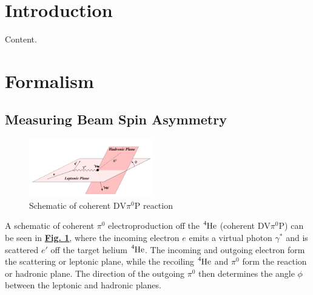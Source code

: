 \documentclass[10pt,prd,aps,showpacs,twocolumn,unsortedaddress]{revtex4-1}
\newcommand\he{{\ce{^{4}He}}}
\newcommand\pio{{\pi^0}}
\newcommand\dvmp{{\text{DV}\pio\text{P}}}
\renewcommand\b[1]{{\textbf{#1}}}
\renewcommand\u[1]{{\underline{#1}}}
\newcommand\Fig[1]{\b{{\u{{Fig. #1}}}}}
\begin{document}

\section{Introduction \label{intro}}
\label{sect1}
Content.
\section{Formalism \label{formalism}}

\subsection{Measuring Beam Spin Asymmetry 
\label{measure_bsa}}
\begin{figure}[h!]
    \captionsetup{width=0.48\linewidth, format = hang}
    \includegraphics[width = 0.48\textwidth]{figs/theory/hadronic_phi_nuclear}
    \caption[]{Schematic of coherent $\dvmp$ reaction }
    \label{schematic}
\end{figure}
A schematic of coherent $\pio$ electroproduction off the $\he$ (coherent $\dvmp$) can be seen in \Fig{\ref{schematic}}, 
where the incoming electron $e$ emits a virtual photon $\gamma^*$ and is scattered $e'$ off the target helium $\he$. 
The incoming and outgoing electron form the scattering or leptonic plane, while the recoiling $\he$ and $\pio$ form the reaction or hadronic plane. 
The direction of the outgoing $\pio$ then determines the angle $\phi$ between the leptonic and hadronic planes. 
\end{document}
